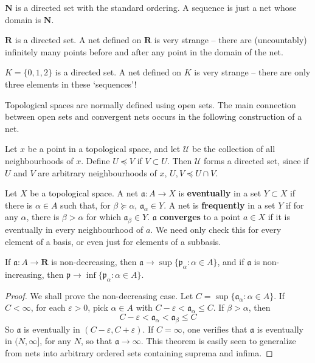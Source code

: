 \begin{example}
    $\mathbf{N}$ is a directed set with the standard ordering. A sequence is just a net whose domain is $\mathbf{N}$.
\end{example}

\begin{example}
    $\mathbf{R}$ is a directed set. A net defined on $\mathbf{R}$ is very strange -- there are (uncountably) infinitely many points before and after any point in the domain of the net.
\end{example}

\begin{example}
    $K = \{ 0, 1, 2 \}$ is a directed set. A net defined on $K$ is very strange -- there are only three elements in these `sequences'!
\end{example}

Topological spaces are normally defined using open sets. The main connection between open sets and convergent nets occurs in the following construction of a net.

\begin{example}
    Let $x$ be a point in a topological space, and let $\mathcal{U}$ be the collection of all neighbourhoods of $x$. Define $U \preceq V$ if $V \subset U$. Then $\mathcal{U}$ forms a directed set, since if $U$ and $V$ are arbitrary neighbourhoods of $x$, $U, V \preceq U \cap V$.
\end{example}

Let $X$ be a topological space. A net $\mathfrak{a}: A \to X$ is {\bf eventually} in a set $Y \subset X$ if there is $\alpha \in A$ such that, for $\beta \succeq \alpha$, $\mathfrak{a}_\alpha \in Y$. A net is {\bf frequently} in a set $Y$ if for any $\alpha$, there is $\beta > \alpha$ for which $\mathfrak{a}_\beta \in Y$. $\mathfrak{a}$ {\bf converges} to a point $a \in X$  if it is eventually in every neighbourhood of $a$. We need only check this for every element of a basis, or even just for elements of a subbasis.

\begin{theorem}
    If $\mathfrak{a}: A \to \mathbf{R}$ is non-decreasing, then $\mathfrak{a} \to \sup \{ \mathfrak{p}_\alpha : \alpha \in A \}$, and if $\mathfrak{a}$ is non-increasing, then $\mathfrak{p} \to \inf \{ \mathfrak{p}_\alpha : \alpha \in A \}$.
\end{theorem}
\begin{proof}
    We shall prove the non-decreasing case. Let $ C = \sup \{ \mathfrak{a}_\alpha : \alpha \in A \}$. If $C < \infty$, for each $\varepsilon > 0$, pick $\alpha \in A$ with $C - \varepsilon < \mathfrak{a}_\alpha \leq C$. If $\beta > \alpha$, then
    \[ C - \varepsilon < \mathfrak{a}_\alpha < \mathfrak{a}_\beta \leq C \]
    So $\mathfrak{a}$ is eventually in $(C - \varepsilon, C + \varepsilon)$. If $C = \infty$, one verifies that $\mathfrak{a}$ is eventually in $(N,\infty]$, for any $N$, so that $\mathfrak{a} \to \infty$. This theorem is easily seen to generalize from nets into arbitrary ordered sets containing suprema and infima.
\end{proof}

